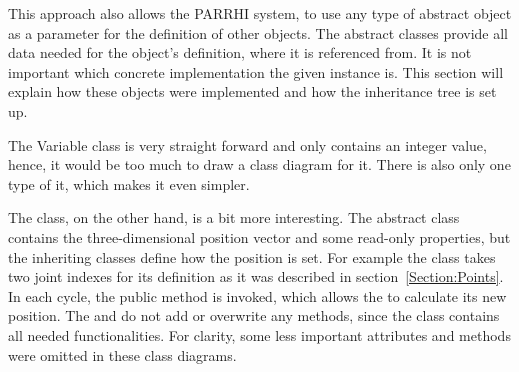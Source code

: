 This approach also allows the PARRHI system, to use any type of abstract object as a parameter for the definition of other objects. The abstract classes provide all data needed for the object's definition, where it is referenced from. It is not important which concrete implementation the given instance is. This section will explain how these objects were implemented and how the inheritance tree is set up.

The Variable class is very straight forward and only contains an integer value, hence, it would be too much to draw a class diagram for it. There is also only one type of it, which makes it even simpler. 

The  class, on the other hand, is a bit more interesting. The abstract  class contains the three-dimensional position vector and some read-only properties, but the inheriting classes define how the position is set. For example the  class takes two joint indexes for its definition as it was described in section~\ref{Section:Points}. In each cycle, the public method  is invoked, which allows the  to calculate its new position. The  and  do not add or overwrite any methods, since the  class contains all needed functionalities. For clarity, some less important attributes and methods were omitted in these class diagrams.


